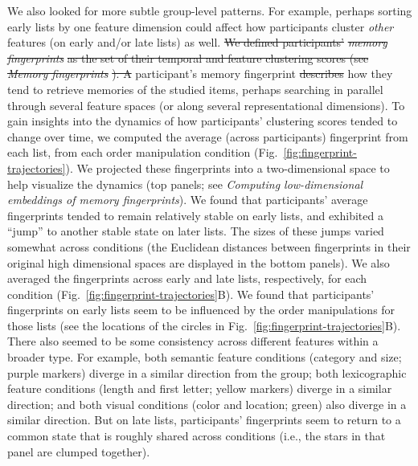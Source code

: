 \documentclass[11pt]{article}
\providecommand{\DIFaddtex}[1]{{\protect\color{blue}\uwave{#1}}} %
\providecommand{\DIFdeltex}[1]{{\protect\color{red}\sout{#1}}}                      %
\providecommand{\DIFaddbegin}{} %
\providecommand{\DIFaddend}{} %
\providecommand{\DIFdelbegin}{} %
\providecommand{\DIFdelend}{} %
\providecommand{\DIFadd}[1]{\texorpdfstring{\DIFaddtex{#1}}{#1}} %
\providecommand{\DIFdel}[1]{\texorpdfstring{\DIFdeltex{#1}}{}} %
\newcommand{\DIFscaledelfig}{0.5}
\newlength{\DIFdelgraphicswidth} %
\newlength{\DIFdelgraphicsheight} %
\newcommand{\DIFaddincludegraphics}[2][]{{\color{blue}\fbox{\DIFOincludegraphics[#1]{#2}}}} %
\newcommand{\DIFdelincludegraphics}[2][]{%
\sbox{\DIFdelgraphicsbox}{\DIFOincludegraphics[#1]{#2}}%
\settoboxwidth{\DIFdelgraphicswidth}{\DIFdelgraphicsbox} %
\settoboxtotalheight{\DIFdelgraphicsheight}{\DIFdelgraphicsbox} %
\scalebox{\DIFscaledelfig}{%
\parbox[b]{\DIFdelgraphicswidth}{\usebox{\DIFdelgraphicsbox}\\[-\baselineskip] \rule{\DIFdelgraphicswidth}{0em}}\llap{\resizebox{\DIFdelgraphicswidth}{\DIFdelgraphicsheight}{%
\setlength{\unitlength}{\DIFdelgraphicswidth}%
\begin{picture}(1,1)%
\thicklines\linethickness{2pt} %
{\color[rgb]{1,0,0}\put(0,0){\framebox(1,1){}}}%
{\color[rgb]{1,0,0}\put(0,0){\line( 1,1){1}}}%
{\color[rgb]{1,0,0}\put(0,1){\line(1,-1){1}}}%
\end{picture}%
}\hspace*{3pt}}} %
} %
\DeclareRobustCommand{\DIFaddbegin}{\DIFOaddbegin \let\includegraphics\DIFaddincludegraphics} %
\DeclareRobustCommand{\DIFaddend}{\DIFOaddend \let\includegraphics\DIFOincludegraphics} %
\DeclareRobustCommand{\DIFdelbegin}{\DIFOdelbegin \let\includegraphics\DIFdelincludegraphics} %
\DeclareRobustCommand{\DIFdelend}{\DIFOaddend \let\includegraphics\DIFOincludegraphics} %
\begin{document}
We also looked for more subtle group-level patterns. For example, perhaps
sorting early lists by one feature dimension could affect how participants
cluster \textit{other} features (on early and/or late lists) as well. \DIFdelbegin \DIFdel{We
defined participants' }\textit{\DIFdel{memory fingerprints}} %
\DIFdel{as the set of their temporal
and feature clustering scores (see }\textit{\DIFdel{Memory fingerprints}}%
\DIFdel{). A
}\DIFdelend \DIFaddbegin \DIFadd{As
described above, a }\DIFaddend participant's memory fingerprint \DIFdelbegin \DIFdel{describes }\DIFdelend \DIFaddbegin \DIFadd{characterizes }\DIFaddend how they tend
to retrieve memories of the studied items, perhaps searching in parallel
through several feature spaces (or along several representational dimensions).
To gain insights into the dynamics of how participants' clustering scores
tended to change over time, we computed the average (across participants)
fingerprint from each list, from each order manipulation condition
(Fig.~\ref{fig:fingerprint-trajectories}). We projected these fingerprints into
a two-dimensional space to help visualize the dynamics (top panels; see
\textit{Computing low-dimensional embeddings of memory fingerprints}). We found
that participants' average fingerprints tended to remain relatively stable on
early lists, and exhibited a ``jump'' to another stable state on later lists.
The sizes of these jumps varied somewhat across conditions (the Euclidean
distances between fingerprints in their original high dimensional spaces are
displayed in the bottom panels). We also averaged the fingerprints across early
and late lists, respectively, for each condition
(Fig.~\ref{fig:fingerprint-trajectories}B). We found that participants'
fingerprints on early lists seem to be influenced by the order manipulations
for those lists (see the locations of the circles in
Fig.~\ref{fig:fingerprint-trajectories}B). There also seemed to be some
consistency across different features within a broader type. For example, both
semantic feature conditions (category and size; purple markers) diverge in a
similar direction from the group; both lexicographic feature conditions (length
and first letter; yellow markers) diverge in a similar direction; and both
visual conditions (color and location; green) also diverge in a similar
direction. But on late lists, participants' fingerprints seem to return to a
common state that is roughly shared across conditions (i.e., the stars in that
panel are clumped together).
\end{document}
